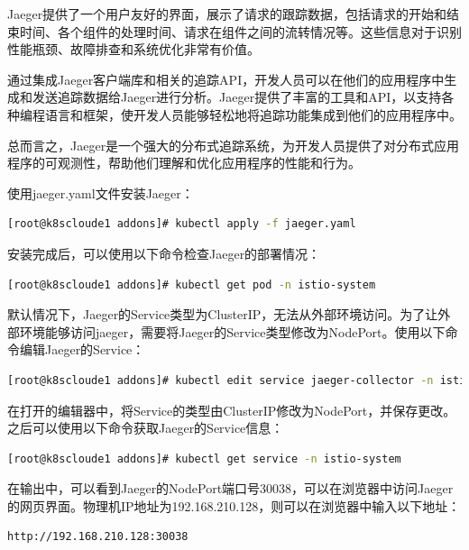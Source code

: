 Jaeger提供了一个用户友好的界面，展示了请求的跟踪数据，包括请求的开始和结束时间、各个组件的处理时间、请求在组件之间的流转情况等。这些信息对于识别性能瓶颈、故障排查和系统优化非常有价值。

通过集成Jaeger客户端库和相关的追踪API，开发人员可以在他们的应用程序中生成和发送追踪数据给Jaeger进行分析。Jaeger提供了丰富的工具和API，以支持各种编程语言和框架，使开发人员能够轻松地将追踪功能集成到他们的应用程序中。

总而言之，Jaeger是一个强大的分布式追踪系统，为开发人员提供了对分布式应用程序的可观测性，帮助他们理解和优化应用程序的性能和行为。


使用jaeger.yaml文件安装Jaeger：
\begin{lstlisting}[language=bash]
	[root@k8scloude1 addons]# kubectl apply -f jaeger.yaml
\end{lstlisting}

安装完成后，可以使用以下命令检查Jaeger的部署情况：
\begin{lstlisting}[language=bash]
	[root@k8scloude1 addons]# kubectl get pod -n istio-system
\end{lstlisting}

默认情况下，Jaeger的Service类型为ClusterIP，无法从外部环境访问。为了让外部环境能够访问jaeger，需要将Jaeger的Service类型修改为NodePort。使用以下命令编辑Jaeger的Service：
\begin{lstlisting}[language=bash]
	[root@k8scloude1 addons]# kubectl edit service jaeger-collector -n istio-system
\end{lstlisting}

在打开的编辑器中，将Service的类型由ClusterIP修改为NodePort，并保存更改。之后可以使用以下命令获取Jaeger的Service信息：
\begin{lstlisting}[language=bash]
	[root@k8scloude1 addons]# kubectl get service -n istio-system
\end{lstlisting}

在输出中，可以看到Jaeger的NodePort端口号30038，可以在浏览器中访问Jaeger的网页界面。物理机IP地址为192.168.210.128，则可以在浏览器中输入以下地址：
\begin{lstlisting}[language=bash]
	http://192.168.210.128:30038
\end{lstlisting}